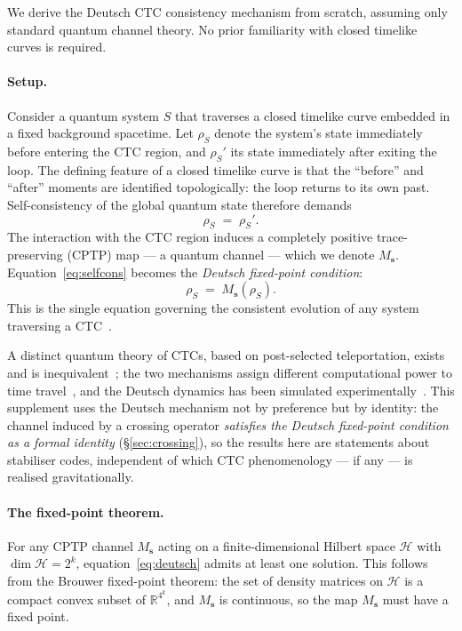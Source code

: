 \documentclass[11pt,a4paper]{article}
\newcommand{\Ms}{M_{\mathbf{s}}}
\begin{document}
We derive the Deutsch CTC consistency mechanism from scratch, assuming only standard quantum channel theory. No prior familiarity with closed timelike curves is required.

\paragraph{Setup.}
Consider a quantum system $S$ that traverses a closed timelike curve embedded in a fixed background spacetime. Let $\rho_S$ denote the system's state immediately before entering the CTC region, and $\rho_S'$ its state immediately after exiting the loop. The defining feature of a closed timelike curve is that the ``before'' and ``after'' moments are identified topologically: the loop returns to its own past. Self-consistency of the global quantum state therefore demands
\begin{equation}
  \rho_S \;=\; \rho_S'.
  \label{eq:selfcons}
\end{equation}
The interaction with the CTC region induces a completely positive trace-preserving (CPTP) map --- a quantum channel --- which we denote $\Ms$. Equation~\eqref{eq:selfcons} becomes the \emph{Deutsch fixed-point condition}:
\begin{equation}
  \rho_S \;=\; \Ms(\rho_S).
  \label{eq:deutsch}
\end{equation}
This is the single equation governing the consistent evolution of any system traversing a CTC~\cite{Deutsch1991, Hawking1992, Novikov1989, MorrisThorneYurtsever1988}.

A distinct quantum theory of CTCs, based on post-selected teleportation, exists and is inequivalent~\cite{Lloyd2011}; the two mechanisms assign different computational power to time travel~\cite{AaronsonWatrous2009}, and the Deutsch dynamics has been simulated experimentally~\cite{Ringbauer2014}. This supplement uses the Deutsch mechanism not by preference but by identity: the channel induced by a crossing operator \emph{satisfies the Deutsch fixed-point condition as a formal identity} (\S\ref{sec:crossing}), so the results here are statements about stabiliser codes, independent of which CTC phenomenology --- if any --- is realised gravitationally.

\paragraph{The fixed-point theorem.}
For any CPTP channel $\Ms$ acting on a finite-dimensional Hilbert space $\mathcal{H}$ with $\dim\mathcal{H}=2^k$, equation~\eqref{eq:deutsch} admits at least one solution. This follows from the Brouwer fixed-point theorem: the set of density matrices on $\mathcal{H}$ is a compact convex subset of $\mathbb{R}^{4^k}$, and $\Ms$ is continuous, so the map $\Ms$ must have a fixed point.
\end{document}
